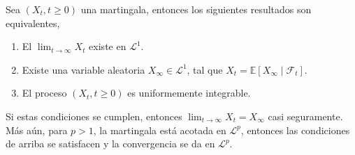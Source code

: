 \begin{theorem}
\label{cond_teodoob}
Sea $(X_t, t \geq 0)$ una martingala, entonces los siguientes resultados son equivalentes, 
\begin{enumerate}
\item El $\lim_{t \rightarrow \infty} X_t$ existe en $\mathcal{L}^{1}$.
\item Existe una variable aleatoria $X_{\infty} \in \mathcal{L}^{1}$, tal que $X_t = \mathbb{E}[X_{\infty} \mid \mathcal{F}_t]$.
\item El proceso $(X_t, t \geq 0)$ es uniformemente integrable.
\end{enumerate}
Si estas condiciones se cumplen, entonces $\lim_{t \rightarrow \infty} X_t = X_{\infty}$ casi seguramente. Más aún, para $p > 1$, la martingala está acotada en $\mathcal{L}^{p}$, entonces las condiciones de arriba se satisfacen y la convergencia se da en $\mathcal{L}^{p}$.
\end{theorem}
